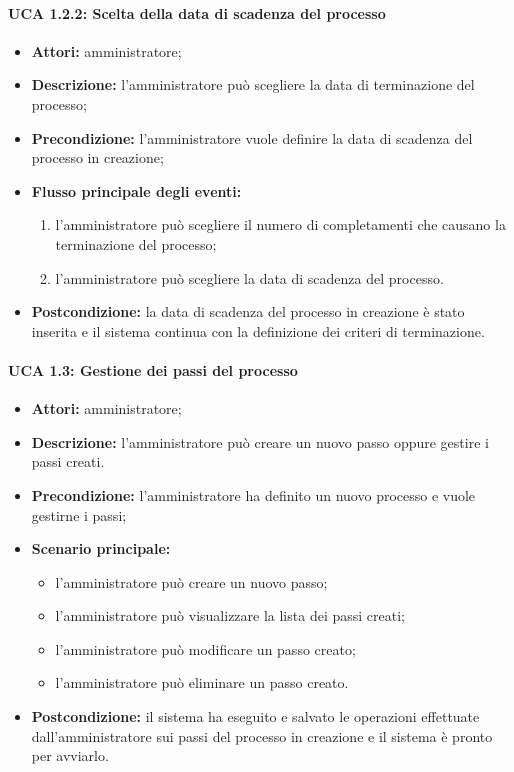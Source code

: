 \paragraph{UCA 1.2.2: Scelta della data di scadenza del processo}
\begin{itemize}
\item \textbf{Attori:}
amministratore;
\item \textbf{Descrizione:}
l'amministratore può scegliere la data di terminazione del processo;
\item \textbf{Precondizione:}
l'amministratore vuole definire la data di scadenza del processo in creazione;
\item \textbf{Flusso principale degli eventi:}
\begin{enumerate}
\item l'amministratore può scegliere il numero di completamenti che causano la terminazione del processo;
\item l'amministratore può scegliere la data di scadenza del processo.
\end{enumerate}
\item \textbf{Postcondizione:}
la data di scadenza del processo in creazione è stato inserita e il sistema continua con la definizione dei criteri di terminazione.
\end{itemize}

\paragraph{UCA 1.3: Gestione dei passi del processo}
\begin{itemize}
\item \textbf{Attori:} 
amministratore;
\item \textbf{Descrizione:} 
l'amministratore può creare un nuovo passo oppure gestire i passi creati.
\item \textbf{Precondizione:} 
l'amministratore ha definito un nuovo processo e vuole gestirne i passi;
\item \textbf{Scenario principale:} 
\begin{itemize}
\item l'amministratore può creare un nuovo passo;
\item l'amministratore può visualizzare la lista dei passi creati;
\item l'amministratore può modificare un passo creato;
\item l'amministratore può eliminare un passo creato.
\end{itemize}
\item \textbf{Postcondizione:}
il sistema ha eseguito e salvato le operazioni effettuate dall'amministratore sui passi del processo in creazione e il sistema è pronto per avviarlo.
\end{itemize}

